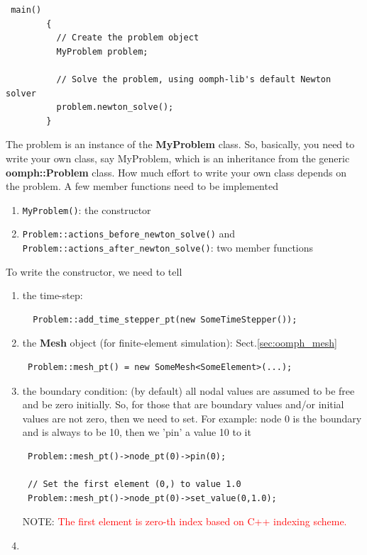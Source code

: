 \begin{verbatim}
 main()
        {
          // Create the problem object
          MyProblem problem; 
          
          // Solve the problem, using oomph-lib's default Newton solver
          problem.newton_solve();
        }
\end{verbatim}
The problem is an instance of the {\bf MyProblem} class. So, basically, you need
to write your own class, say MyProblem, which is an inheritance from the generic
{\bf oomph::Problem} class. How much effort to write your own class depends on
the problem. A few member functions need to be implemented
\begin{enumerate}
  \item \verb!MyProblem()!: the constructor
  \item \verb!Problem::actions_before_newton_solve()! and 
\verb!Problem::actions_after_newton_solve()!: two member functions 
\end{enumerate}

To write the constructor, we need to tell
\begin{enumerate}
  \item the time-step: 
  \begin{verbatim}
  Problem::add_time_stepper_pt(new SomeTimeStepper());
  \end{verbatim}
 \item the {\bf Mesh} object (for finite-element simulation):
 Sect.\ref{sec:oomph_mesh}
 \begin{verbatim}
 Problem::mesh_pt() = new SomeMesh<SomeElement>(...);
 \end{verbatim}
 
 \item the boundary condition: (by default) all nodal values are assumed to be
 free and be zero initially. So, for those that are boundary values and/or
 initial values are not zero, then we need to set. For example: node 0 is the
 boundary and is always to be 10, then we 'pin' a value 10 to it
 \begin{verbatim}
 Problem::mesh_pt()->node_pt(0)->pin(0);
 
 // Set the first element (0,) to value 1.0
 Problem::mesh_pt()->node_pt(0)->set_value(0,1.0);
 \end{verbatim}
 NOTE: \textcolor{red}{The first element is zero-th index based on C++
 indexing scheme.}
 
 \item 
\end{enumerate}

